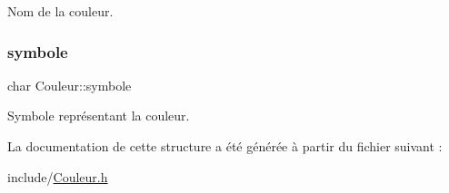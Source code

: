 Nom de la couleur. 

\mbox{\label{structCouleur_a4da2f2ca44f4b0c7c963afd7339f2600}} 
\subsubsection{\texorpdfstring{symbole}{symbole}}
{\footnotesize\ttfamily char Couleur\+::symbole}



Symbole représentant la couleur. 



La documentation de cette structure a été générée à partir du fichier suivant \+:\begin{DoxyCompactItemize}
\item 
include/\hyperlink{Couleur_8h}{Couleur.\+h}\end{DoxyCompactItemize}
